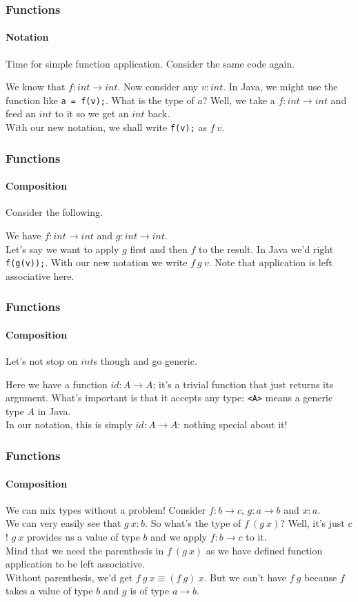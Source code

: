 \documentclass{beamer}
\begin{document}
\begin{frame}
  \frametitle{Functions}
  \framesubtitle{Notation}
  Time for simple function application. Consider the same code again.
  \pause
  
  \pause
  We know that $f:int \rightarrow int$. Now consider any $v:int$. In
  Java, we might use the function like \lstinline|a = f(v);|. What is
  the type of $a$? Well, we take a $f:int \rightarrow int$ and feed an
  $int$ to it so we get an $int$ back.\\
  \pause
  With our new notation, we shall write \lstinline|f(v);| as $f\:v$.\\

\end{frame}
\begin{frame}
  \frametitle{Functions}
  \framesubtitle{Composition}
  Consider the following.
  
  \pause
  We have $f:int \rightarrow int$ and $g:int \rightarrow int$.\\
  Let's say we want to apply $g$ first and then $f$ to the result. In Java
  we'd right \lstinline|f(g(v));|. With our new notation we write
  $f\:g\:v$. Note that application is left associative here.\\
\end{frame}
\begin{frame}
  \frametitle{Functions}
  \framesubtitle{Composition}
  Let's not stop on $int$s though and go generic.
  
  \pause
  Here we have a function $id:A \rightarrow A$; it's a trivial
  function that just returns its argument. What's important is that
  it accepts any type: \lstinline|<A>| means a generic type $A$ in
  Java.\\
  \pause
  In our notation, this is simply $id:A \rightarrow A$: nothing
  special about it!
\end{frame}
\begin{frame}
  \frametitle{Functions}
  \framesubtitle{Composition}
  We can mix types without a problem! Consider $f:b \rightarrow c$, $g:a
  \rightarrow b$ and $x:a$.\\
  \pause
  We can very easily see that $g\:x:b$. So what's the type of
  $f\:(g\:x)$? Well, it's just $c$! $g\:x$ provides us a value of type
  $b$ and we apply $f:b \rightarrow c$ to it.\\
  \pause
  Mind that we need the parenthesis in $f\:(g\:x)$ as we have defined
  function application to be left associative.\\
  Without parenthesis, we'd get $f\:g\:x \equiv (f\:g)\:x$. But we
  can't have $f\:g$ because $f$ takes a value of type $b$ and $g$ is
  of type $a \rightarrow b$.\\
\end{frame}
\end{document}
